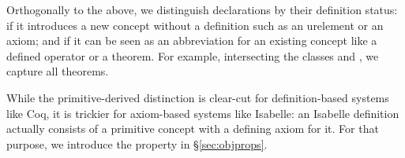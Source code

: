 %
%

Orthogonally to the above, we distinguish declarations by their definition status:  if it introduces a new concept without a definition such as an urelement or an axiom; and  if it can be seen as an abbreviation for an existing concept like a defined operator or a theorem.
For example, intersecting the classes \truthObject and , we capture all theorems.

While the primitive-derived distinction is clear-cut for definition-based systems like Coq, it is trickier for axiom-based systems like Isabelle: an Isabelle definition actually consists of a primitive concept with a defining axiom for it.
For that purpose, we introduce the  property in \S\ref{sec:objprops}.
  
